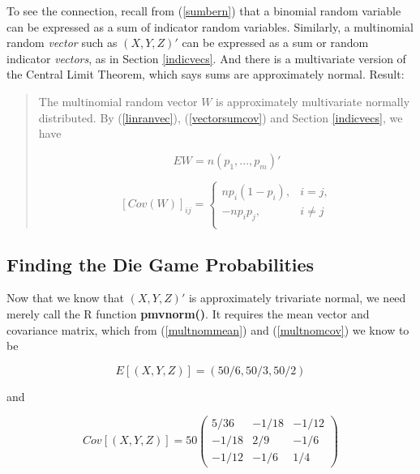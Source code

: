 To see the connection, recall from (\ref{sumbern}) that a binomial
random variable can be expressed as a sum of indicator random variables.
Similarly, a multinomial random {\it vector} such as $(X,Y,Z)'$ can be
expressed as a sum or random indicator {\it vectors}, as in Section
\ref{indicvecs}.  And there is a multivariate version of the Central
Limit Theorem, which says sums are approximately normal.  Result:

\begin{quote}

The multinomial random vector $W$ is approximately multivariate normally
distributed.  By (\ref{linranvec}), (\ref{vectorsumcov}) and Section
\ref{indicvecs}, we have

\begin{equation}
\label{multnommean}
EW = n(p_1,...,p_m)'
\end{equation}

\begin{equation}
\label{multnomcov}
[Cov(W)]_{ij} = 
\begin{cases}
np_i(1-p_i), & i = j, \\
-np_i p_j, & i \neq j \\
\end{cases} 
\end{equation}

\end{quote}

\subsection{Finding the Die Game Probabilities}

Now that we know that $(X,Y,Z)'$ is approximately trivariate normal, we
need merely call the R function {\bf pmvnorm()}.  It requires the mean
vector and covariance matrix, which from (\ref{multnommean}) and
(\ref{multnomcov}) we know to be

\begin{equation}
E[(X,Y,Z)] = (50/6, 50/3, 50/2)
\end{equation}

and

\begin{equation}
Cov[(X,Y,Z)] =  
50
\begin{pmatrix}
5/36 & -1/18 & -1/12 \\
-1/18 & 2/9 & -1/6 \\
-1/12 & -1/6 & 1/4 
\end{pmatrix}
\end{equation}

